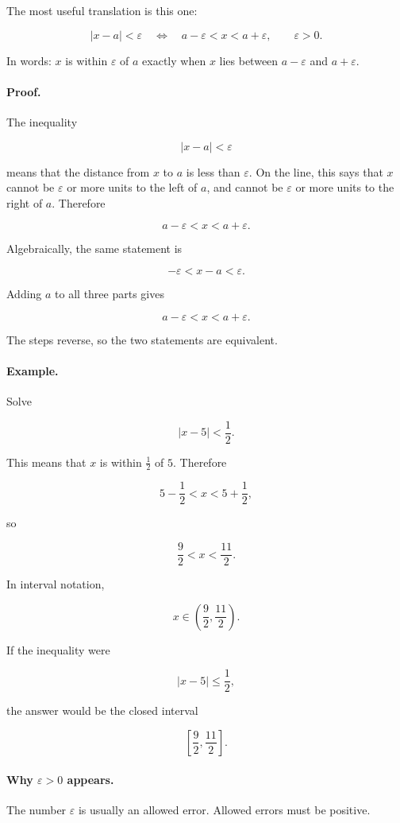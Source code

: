The most useful translation is this one:

\[
\boxed{|x-a|<\varepsilon
\quad \Longleftrightarrow \quad
a-\varepsilon<x<a+\varepsilon,}
\qquad \varepsilon>0.
\]

In words: \(x\) is within \(\varepsilon\) of \(a\) exactly when \(x\) lies between \(a-\varepsilon\) and \(a+\varepsilon\).

\paragraph{Proof.}
The inequality

\[
|x-a|<\varepsilon
\]

means that the distance from \(x\) to \(a\) is less than \(\varepsilon\). On the line, this says that \(x\) cannot be \(\varepsilon\) or more units to the left of \(a\), and cannot be \(\varepsilon\) or more units to the right of \(a\). Therefore

\[
a-\varepsilon<x<a+\varepsilon.
\]

Algebraically, the same statement is

\[
-\varepsilon<x-a<\varepsilon.
\]

Adding \(a\) to all three parts gives

\[
a-\varepsilon<x<a+\varepsilon.
\]

The steps reverse, so the two statements are equivalent.

\paragraph{Example.}
Solve

\[
|x-5|<\frac12.
\]

This means that \(x\) is within \(\frac12\) of \(5\). Therefore

\[
5-\frac12<x<5+\frac12,
\]

so

\[
\frac92<x<\frac{11}{2}.
\]

In interval notation,

\[
x\in\left(\frac92,\frac{11}{2}\right).
\]

If the inequality were

\[
|x-5|\le \frac12,
\]

the answer would be the closed interval

\[
\left[\frac92,\frac{11}{2}\right].
\]

\paragraph{Why \(\varepsilon>0\) appears.}
The number \(\varepsilon\) is usually an allowed error. Allowed errors must be positive.

